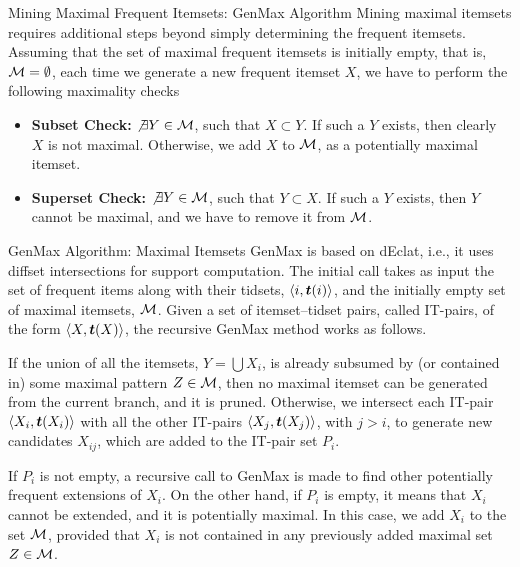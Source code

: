 \begin{frame}{Mining Maximal Frequent Itemsets: GenMax Algorithm}
Mining maximal itemsets requires additional steps beyond
simply determining the frequent itemsets.
Assuming that the set of maximal frequent itemsets is initially
empty, that is, ${\mathcal M} = \emptyset$, each time we generate a new
frequent itemset $X$, we have to perform the following maximality checks
\begin{itemize}
\item {\bf Subset Check:} $\not \exists  Y \in {{\mathcal M}}$, such that $X
  \subset Y$. If such a $Y$ exists, then clearly $X$ is not maximal.
  Otherwise, we add $X$ to ${\mathcal M}$, as a potentially maximal itemset.

\item {\bf Superset Check:} $\not \exists  Y \in {{\mathcal M}}$, such that $Y
  \subset X$. If such a $Y$ exists, then $Y$ cannot be maximal, and we
  have to remove it from ${\mathcal M}$.
\end{itemize}
\end{frame}


\begin{frame}{GenMax Algorithm: Maximal Itemsets}
  \small
  GenMax is based on dEclat, i.e., it uses diffset intersections for
  support computation.
The initial call takes as input the set of
frequent items
along with their tidsets, $\langle i,{{\boldsymbol t}}(i) \rangle$, and the initially
empty set of maximal itemsets, ${\mathcal M}$. Given a set of itemset--tidset
pairs, called IT-pairs, of the form
$\langle X, {{\boldsymbol t}}(X) \rangle$, the recursive GenMax method works as follows.

\medskip
If the union of all the itemsets, $Y = \bigcup X_i$,
is already subsumed by (or contained in) some maximal pattern $Z
\in {\mathcal M}$, then no maximal itemset can be generated from the
current branch, and it is pruned.
Otherwise,
we intersect each IT-pair
$\langle X_i,{{\boldsymbol t}}(X_i) \rangle$ with all the other IT-pairs
$\langle X_{j},{{\boldsymbol t}}(X_{j}) \rangle$, with $j > i$, to
generate new candidates $X_{ij}$, which are added to the IT-pair
set $P_i$. 

\medskip
If $P_i$ is not empty, a recursive call to GenMax is made
to f\/{i}nd other potentially frequent extensions of
$X_i$. On the other hand, if $P_i$ is empty, it
means that $X_i$ cannot be extended, and it is potentially
maximal. In this case, we add $X_i$ to the set ${\mathcal M}$, provided
that $X_i$ is not contained in any previously added maximal set
$Z \in {\mathcal M}$.
\end{frame}

